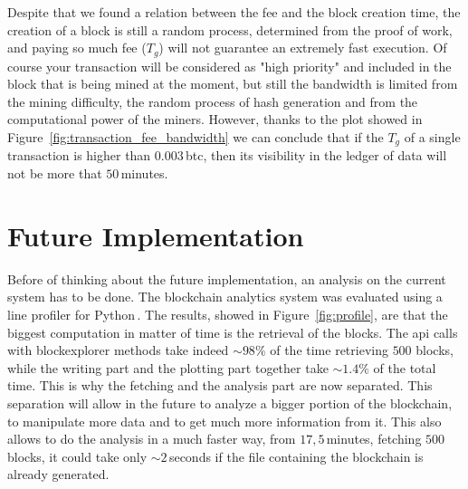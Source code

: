 \documentclass[USenglish]{uit-thesis}
\begin{document}
Despite that we found a relation between the fee and the block creation time, the
creation of a block is still a random process, determined from the proof of work, and paying
so much fee ($T_g$) will not guarantee an extremely fast execution. Of course your
transaction will be considered as "high priority" and included in the block that is being
mined at the moment, but still the bandwidth is limited from the mining difficulty, the random process
of hash generation and from the computational power of the miners. However, thanks to the plot
showed in Figure~\ref{fig:transaction_fee_bandwidth} we can conclude that if the $T_g$ of a single
transaction is higher than $0.003$\,\gls{btc}, then its visibility in the ledger of data will not be
more that $50$\,minutes.

\section{Future Implementation}
\label{sec:future_implementation}
Before of thinking about the future implementation, an analysis on the
current system has to be done. The blockchain analytics system was evaluated using a line profiler for
Python\,\cite{line_profiler}. The results, showed in Figure~\ref{fig:profile}, are that the biggest
computation in matter of time is the retrieval of the blocks.
The \gls{api} calls with blockexplorer methods take indeed $\sim98\%$ of the time retrieving
$500$ blocks, while the writing part and the plotting part together take $\sim1.4\%$
of the total time. This is why the fetching and the analysis part are now separated.
This separation will allow in the future to analyze a bigger portion of the blockchain,
to manipulate more data and to get much more information from it.
This also allows to do the analysis in a much faster way, from $17,5$\,minutes,
fetching $500$ blocks, it could take only $\sim2$\,seconds if
the file containing the blockchain is already generated.
\end{document}
